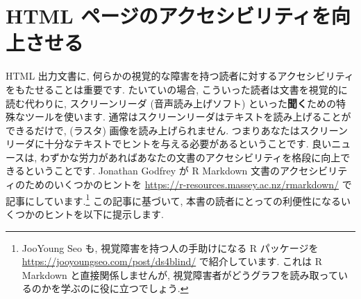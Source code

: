 \documentclass[
  11pt,
  lualatex,
  ja=standard]{bxjsreport}
\begin{document}
\hypertarget{html-accessibility}{%
\section{HTML ページのアクセシビリティを向上させる}\label{html-accessibility}}

HTML 出力文書に, 何らかの視覚的な障害を持つ読者に対するアクセシビリティをもたせることは重要です. たいていの場合, こういった読者は文書を視覚的に読む代わりに, スクリーンリーダ (音声読み上げソフト) といった\textbf{聞く}ための特殊なツールを使います. 通常はスクリーンリーダはテキストを読み上げることができるだけで, (ラスタ) 画像を読み上げられません. つまりあなたはスクリーンリーダに十分なテキストでヒントを与える必要があるということです. 良いニュースは, わずかな労力があればあなたの文書のアクセシビリティを格段に向上できるということです. Jonathan Godfrey が R Markdown 文書のアクセシビリティのためのいくつかのヒントを \url{https://r-resources.massey.ac.nz/rmarkdown/} で記事にしています.\footnote{JooYoung Seo も, 視覚障害を持つ人の手助けになる R パッケージを \url{https://jooyoungseo.com/post/ds4blind/} で紹介しています. これは R Markdown と直接関係しませんが, 視覚障害者がどうグラフを読み取っているのかを学ぶのに役に立つでしょう.} この記事に基づいて, 本書の読者にとっての利便性になるいくつかのヒントを以下に提示します.
\end{document}
